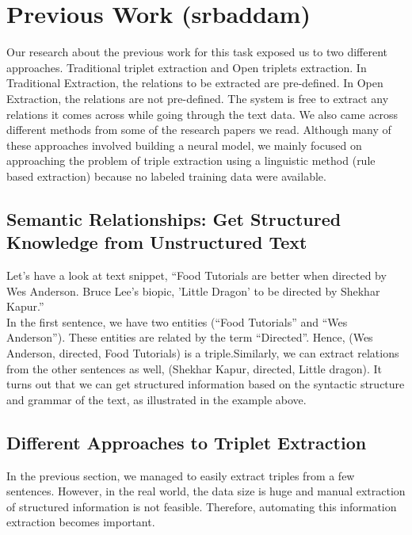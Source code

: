 \documentclass[11pt,letterpaper]{article}
\begin{document}
\section{Previous Work (srbaddam)}
Our research about the previous work for this task exposed us to two different approaches. Traditional triplet extraction and Open triplets extraction. In Traditional Extraction, the relations to be extracted are pre-defined. In Open Extraction, the relations are not pre-defined. The system is free to extract any relations it comes across while going through the text data. We also came across different methods from some of the research papers we read. Although many of these approaches involved building a neural model, we mainly focused on approaching the problem of triple extraction using a linguistic method (rule based extraction) because no labeled training data were available.

\subsection{Semantic Relationships: Get Structured Knowledge from Unstructured Text}
Let's have a look at text snippet, “Food Tutorials are better when directed by Wes Anderson. Bruce Lee's biopic, 'Little Dragon' to be directed by Shekhar Kapur.” \\

In the first sentence, we have two entities (“Food Tutorials” and “Wes Anderson”). These entities are related by the term “Directed”. Hence, (Wes Anderson, directed, Food Tutorials) is a triple.Similarly, we can extract relations from the other sentences as well, (Shekhar Kapur, directed, Little dragon). It turns out that we can get structured information based on the syntactic structure and grammar of the text, as illustrated in the example above.

\subsection{Different Approaches to Triplet Extraction}
In the previous section, we managed to easily extract triples from a few sentences. However, in the real world, the data size is huge and manual extraction of structured information is not feasible. Therefore, automating this information extraction becomes important.\\
\end{document}
